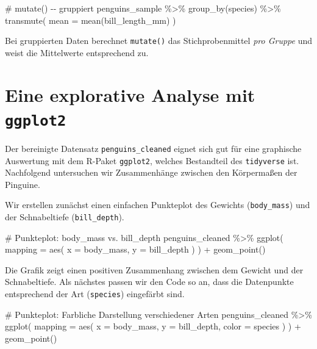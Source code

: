 \documentclass[
  a4paper,
  DIV=11,
  oneside]{scrreprt}
\newenvironment{Shaded}{\begin{snugshade}}{\end{snugshade}}
\newcommand{\NormalTok}[1]{\textcolor[rgb]{0.00,0.23,0.31}{#1}}
\begin{document}
\begin{Shaded}
\begin{Highlighting}[]
\NormalTok{\# mutate() {-}{-} gruppiert}
\NormalTok{penguins\_sample \%\textgreater{}\%}
\NormalTok{  group\_by(species) \%\textgreater{}\%}
\NormalTok{  transmute(}
\NormalTok{    mean = mean(bill\_length\_mm)}
\NormalTok{  )}
\end{Highlighting}
\end{Shaded}

Bei gruppierten Daten berechnet \texttt{mutate()} das Stichprobenmittel
\emph{pro Gruppe} und weist die Mittelwerte entsprechend zu.

\section{\texorpdfstring{Eine explorative Analyse mit
\texttt{ggplot2}}{Eine explorative Analyse mit ggplot2}}\label{eine-explorative-analyse-mit-ggplot2}

Der bereinigte Datensatz \texttt{penguins\_cleaned} eignet sich gut für
eine graphische Auswertung mit dem R-Paket \texttt{ggplot2}, welches
Bestandteil des \texttt{tidyverse} ist. Nachfolgend untersuchen wir
Zusammenhänge zwischen den Körpermaßen der Pinguine.

Wir erstellen zunächst einen einfachen Punkteplot des Gewichts
(\texttt{body\_mass}) und der Schnabeltiefe (\texttt{bill\_depth}).

\begin{Shaded}
\begin{Highlighting}[]
\NormalTok{\# Punkteplot: body\_mass vs. bill\_depth}
\NormalTok{penguins\_cleaned \%\textgreater{}\%}
\NormalTok{  ggplot(}
\NormalTok{    mapping = aes(}
\NormalTok{      x = body\_mass, }
\NormalTok{      y = bill\_depth}
\NormalTok{    )}
\NormalTok{  ) +}
\NormalTok{  geom\_point()}
\end{Highlighting}
\end{Shaded}

Die Grafik zeigt einen positiven Zusammenhang zwischen dem Gewicht und
der Schnabeltiefe. Als nächstes passen wir den Code so an, dass die
Datenpunkte entsprechend der Art (\texttt{species}) eingefärbt sind.

\begin{Shaded}
\begin{Highlighting}[]
\NormalTok{\# Punkteplot: Farbliche Darstellung verschiedener Arten}
\NormalTok{penguins\_cleaned \%\textgreater{}\%}
\NormalTok{  ggplot(}
\NormalTok{    mapping = aes(}
\NormalTok{      x = body\_mass, }
\NormalTok{      y = bill\_depth, }
\NormalTok{      color = species}
\NormalTok{    )}
\NormalTok{  ) +}
\NormalTok{  geom\_point()}
\end{Highlighting}
\end{Shaded}
\end{document}
